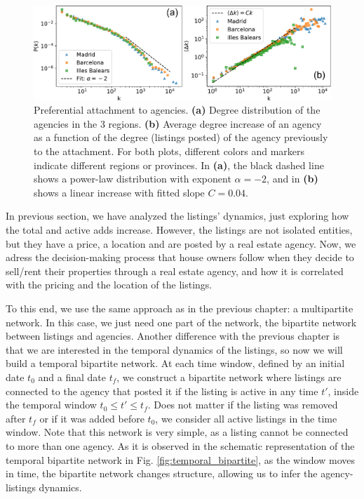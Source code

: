 \begin{figure}
    \centering
    \includegraphics[width =\textwidth]{Figs/Idealista_dynamics/panel_degree.pdf}
	\caption[Preferential attachment to agencies.]{\label{fig:panel_degree}Preferential attachment to agencies. \textbf{(a)} Degree distribution of the agencies in the 3 regions. \textbf{(b)} Average degree increase of an agency as a function of the degree (listings posted) of the agency previously to the attachment. For both plots, different colors and markers indicate different regions or provinces. In \textbf{(a)}, the black dashed line shows a power-law distribution with exponent $\alpha  =-2$, and in \textbf{(b)} shows a linear increase with fitted slope $C = 0.04$.}
\end{figure}

In previous section, we have analyzed the listings' dynamics, just exploring how the total and active adds increase. However, the listings are not isolated entities, but they have a price, a location and are posted by a real estate agency. Now, we adress the decision-making process that house owners follow when they decide to sell/rent their properties through a real estate agency, and how it is correlated with the pricing and the location of the listings.

To this end, we use the same approach as in the previous chapter: a multipartite network. In this case, we just need one part of the network, the bipartite network between listings and agencies. Another difference with the previous chapter is that we are interested in the temporal dynamics of the listings, so now we will build a temporal bipartite network. At each time window, defined by an initial date $t_0$ and a final date $t_f$, we construct a bipartite network where listings are connected to the agency that posted it if the listing is active in any time $t'$, inside the temporal window $t_0 \leq t' \leq t_f$. Does not matter if the listing was removed after $t_f$ or if it was added before $t_0$, we consider all active listings in the time window. Note that this network is very simple, as a listing cannot be connected to more than one agency. As it is observed in the schematic representation of the temporal bipartite network in Fig. \ref{fig:temporal_bipartite}, as the window moves in time, the bipartite network changes structure, allowing us to infer the agency-listings dynamics.

